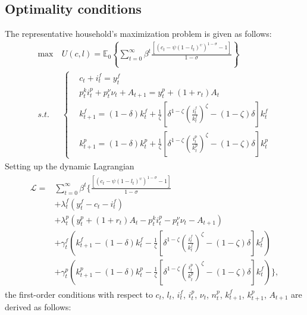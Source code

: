 \documentclass[11pt,a4paper]{article}
\numberwithin{equation}{section}
\theoremstyle{definition}
\begin{document}
\subsection{Optimality conditions}
The representative household's maximization problem is given as follows:
\begin{align*}
\max &~U(c,l)=\mathbb{E}_{0}\left\{\sum_{t=0}^{\infty} \beta^{t} \frac{[(c_{t}-\psi(1-l_{t})^{\upsilon})^{1-\sigma}-1]}{1-\sigma}\right\} \\
s.t. &~
\left\{
    \begin{aligned}
    & c_{t}+i_{t}^{f} = y_{t}^{f} \\
    & p_{t}^{k}i_{t}^{p}+p_{t}^{\nu}\nu_{t}+A_{t+1} = y^{p}_{t}+(1+r_{t})A_{t} \\
    & k_{t+1}^{f}=(1-\delta)k_{t}^{f}+\frac{1}{\zeta}\left[\delta^{1-\zeta}(\frac{i^{f}_{t}}{k^{f}_{t}})^{\zeta}-(1-\zeta)\delta\right]k_{t}^{f} \\
    & k_{t+1}^{p}=(1-\delta)k_{t}^{p}+\frac{1}{\zeta}\left[\delta^{1-\zeta}(\frac{i^{p}_{t}}{k^{p}_{t}})^{\zeta}-(1-\zeta)\delta\right]k_{t}^{p}
    \end{aligned}
\right.
\end{align*}
Setting up the dynamic Lagrangian
\begin{align}
\begin{split}
\mathcal{L}= & \sum_{t=0}^{\infty}\beta^{t}\Biggl\{\frac{[(c_{t}-\psi(1-l_{t})^{\upsilon})^{1-\sigma}-1]}{1-\sigma} \\
& +\lambda^{f}_{t}(y_{t}^{f}-c_{t}-i_{t}^{f}) \\
& +\lambda^{p}_{t}(y^{p}_{t}+(1+r_{t})A_{t}-p_{t}^{k}i_{t}^{p}-p_{t}^{\nu}\nu_{t}-A_{t+1} ) \\
& +\gamma^{f}_{t}(k_{t+1}^{f}-(1-\delta)k_{t}^{f}-\frac{1}{\zeta}\left[\delta^{1-\zeta}(\frac{i^{f}_{t}}{k^{f}_{t}})^{\zeta}-(1-\zeta)\delta\right]k_{t}^{f}) \\
& +\gamma^{p}_{t}(k_{t+1}^{p}-(1-\delta)k_{t}^{p}-\frac{1}{\zeta}\left[\delta^{1-\zeta}(\frac{i^{p}_{t}}{k^{p}_{t}})^{\zeta}-(1-\zeta)\delta\right]k_{t}^{f})\Biggr\},
\end{split}
\end{align}
the first-order conditions with respect to $c_{t}$, $l_{t}$, $i^{f}_{t}$, $i^{p}_{t}$, $\nu_{t}$, $n^{p}_{t}$, $k^{f}_{t+1}$, $k^{p}_{t+1}$, $A_{t+1}$ are derived as follows:
\end{document}
